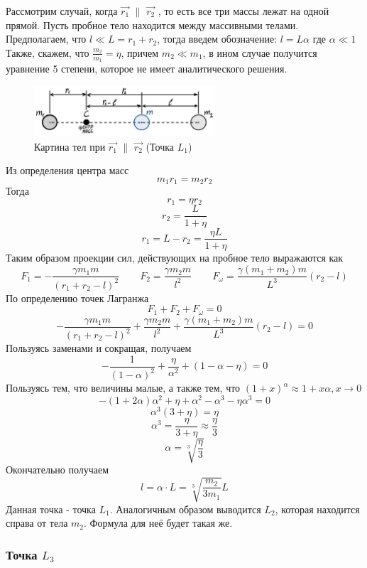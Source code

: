 \documentclass[a4paper,12pt]{article}
\begin{document}
Рассмотрим случай, когда $\vec{r_1}$ $\|$ $\vec{r_2}$ , то есть все три массы лежат на одной прямой.
Пусть пробное тело находится между массивными телами.
Предполагаем, что $l \ll L = r_1 + r_2$, тогда введем обозначение: $l = L\alpha$ где $\alpha \ll 1$
Также, скажем, что $\frac{m_2}{m_1} = \eta$, причем $m_2 \ll m_1$, в ином случае получится
уравнение 5 степени, которое не имеет аналитического решения.                                    
\begin{figure}[H]
    \begin{center}
	\includegraphics[width=0.6\textwidth]{L1L2.jpg}
	\caption{Картина тел при $\vec{r_1}$ $\|$ $\vec{r_2}$ (Точка $L_1$)}
    \end{center}
\end{figure}
Из определения центра масс 
$$ m_1 r_1 = m_2 r_2  $$
Тогда
$$ r_1 = \eta r_2  $$     
$$ r_2 = \frac{L}{1 + \eta} $$
$$ r_1 = L - r_2 = \frac{\eta L}{1 + \eta}  $$
Таким образом проекции сил, действующих на пробное тело выражаются как
$$ F_1 = -\frac{\gamma m_1 m}{(r_1 + r_2 - l)^2} \hspace{25pt} F_2 = \frac{\gamma m_2 m}{l^2} \hspace{25pt} F_{\omega} = \frac{\gamma (m_1 + m_2) m}{L^3} (r_2 - l) $$
По определению точек Лагранжа
$$ F_1 + F_2 + F_{\omega} = 0 $$
$$ -\frac{\gamma m_1 m}{(r_1 + r_2 - l)^2} + \frac{\gamma m_2 m}{l^2} + \frac{\gamma (m_1 + m_2) m}{L^3} (r_2 - l) = 0 $$
Пользуясь заменами и сокращая, получаем
$$ -\frac{1}{(1 - \alpha)^2} + \frac{\eta}{\alpha^2} + (1 - \alpha - \eta) = 0 $$
Пользуясь тем, что величины малые, а также тем, что $(1 + x)^{\alpha} \approx 1 + x\alpha, x \rightarrow 0$
$$ -(1 + 2\alpha) \alpha^2 + \eta + \alpha^2 - \alpha^3 - \eta \alpha^3 = 0 $$
$$ \alpha^3 (3 + \eta) = \eta  $$
$$ \alpha^3 = \frac{\eta}{3 + \eta} \approx \frac{\eta}{3} $$
$$ \alpha = \sqrt[3]{\frac{\eta}{3}}$$
Окончательно получаем
$$ l = \alpha \cdot L = \sqrt[3]{\frac{m_2}{3 m_1}} L $$
Данная точка - точка $L_1$. Аналогичным образом выводится $L_2$, которая находится справа от тела $m_2$. Формула для неё будет такая же.

\subsubsection{Точка $L_3$}
\end{document}
